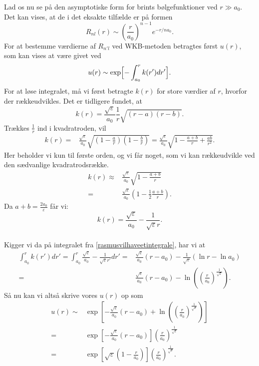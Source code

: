 Lad os nu se på den asymptotiske form for brints bølgefunktioner ved $r\gg a_0$. Det kan vises, at de i det eksakte tilfælde er på formen
\begin{equation}
    R_{nl}(r) \sim \left(\frac{r}{a_0}\right)^{n-1}e^{-r/na_0}.
  \label{eq:eksaktR}
\end{equation}
%
For at bestemme værdierne af $R_{n'l}$ ved WKB-metoden betragtes først $u(r)$, som kan vises at være givet ved
\begin{equation}
    u(r) \sim \exp\Bigl[-\int_{a_0}^{r}k(r')dr'\Bigr].
    \label{rasmusvilhaveetintegrale}
\end{equation}
For at løse integralet, må vi først betragte $k(r)$ for store værdier af $r$, hvorfor der rækkeudvikles. Det er tidligere fundet, at
\begin{equation}
    k(r) = \frac{\sqrt{\varepsilon}}{a_0}\frac{1}{r}\sqrt{(r-a)(r-b)}.
\end{equation}
Trækkes $\frac{1}{r}$ ind i kvadratroden, vil
\begin{align}
    k(r) = & \frac{\sqrt{\varepsilon}}{a_0}\sqrt{(1-\frac{a}{r})(1-\frac{b}{r})} = \frac{\sqrt{\varepsilon}}{a_0}\sqrt{1-\frac{a+b}{r}+\frac{ab}{r^2}}.
\end{align}
Her beholder vi kun til første orden, og vi får noget, som vi kan rækkeudvikle ved den sædvanlige kvadratrodsrække.
\begin{align}
  k(r) \approx & \frac{\sqrt{\varepsilon}}{a_0}\sqrt{1-\frac{a+b}{r}}\\
  = & \frac{\sqrt{\varepsilon}}{a_0}\left(1-\frac{1}{2}\frac{a+b}{r}\right).
\end{align}
Da $a+b = \frac{2a_0}{\varepsilon}$ får vi:
\begin{equation}
  k(r) = \frac{\sqrt{\varepsilon}}{a_0}-\frac{1}{\sqrt{\varepsilon}r}.
\end{equation}
\\
Kigger vi da på integralet fra \cref{rasmusvilhaveetintegrale}, har vi at
\begin{align}
    \int_{a_0}^{r}k(r')dr' = \int_{a_0}^{r} \frac{\sqrt{\varepsilon}}{a_0}-\frac{1}{\sqrt{\varepsilon}r'} dr'= 
& \frac{\sqrt{\varepsilon}}{a_0}(r-a_0) - \frac{1}{\sqrt{\varepsilon}}\left(\ln{r}-\ln{a_0}\right)\\
= & \frac{\sqrt{\varepsilon}}{a_0}(r-a_0) - \ln{((\frac{r}{a_0})^{\frac{1}{\sqrt{\varepsilon}}})}.
\end{align}
%
Så nu kan vi altså skrive vores $u(r)$ op som
\begin{align}
  u(r) \sim & \exp\left[-\frac{\sqrt{\varepsilon}}{a_0}(r-a_0) + \ln{((\frac{r}{a_0})^{\frac{1}{\sqrt{\varepsilon}}})}\right]\\
        = & \exp\left[-\frac{\sqrt{\varepsilon}}{a_0}(r-a_0)\right] {\left(\frac{r}{a_0}\right)}^{\frac{1}{\sqrt{\varepsilon}}}\\
        = & \exp\left[\sqrt{\varepsilon}(1-\frac{r}{a_0})\right] {\left(\frac{r}{a_0}\right)}^{\frac{1}{\sqrt{\varepsilon}}}.
\end{align}
